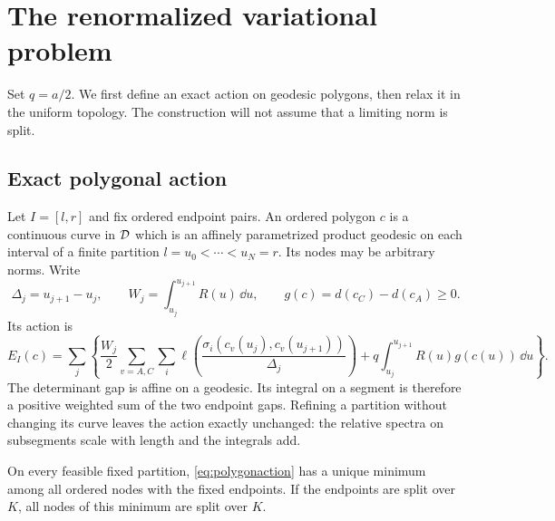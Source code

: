 \section{The renormalized variational problem}\label{sec:variational}

Set $q=a/2$. We first define an exact action on geodesic polygons, then
relax it in the uniform topology. The construction will not assume that
a limiting norm is split.

\subsection{Exact polygonal action}
Let $I=[l,r]$ and fix ordered endpoint pairs. An ordered polygon $c$ is
a continuous curve in $\mathcal D$ which is an affinely parametrized product
geodesic on each interval of a finite partition
$l=u_0<\cdots<u_N=r$. Its nodes may be arbitrary norms. Write
\[
 \Delta_j=u_{j+1}-u_j,\qquad
 W_j=\int_{u_j}^{u_{j+1}}R(u)\,\dd u,\qquad
 g(c)=d(c_C)-d(c_A)\ge0.
\]
Its action is
\begin{equation}\label{eq:polygonaction}
 E_I(c)=\sum_j\left\{
 \frac{W_j}{2}\sum_{v=A,C}\sum_i
   \ell\left(\frac{\sigma_i(c_v(u_j),c_v(u_{j+1}))}{\Delta_j}\right)
 +q\int_{u_j}^{u_{j+1}}R(u)g(c(u))\,\dd u\right\}.
\end{equation}
The determinant gap is affine on a geodesic. Its integral on a segment
is therefore a positive weighted sum of the two endpoint gaps.
Refining a partition without changing its curve leaves the action
exactly unchanged: the relative spectra on subsegments scale with
length and the integrals add.

\begin{proposition}\label{prop:finitepartition}
On every feasible fixed partition, \eqref{eq:polygonaction} has a unique
minimum among all ordered nodes with the fixed endpoints. If the endpoints
are split over $K$, all nodes of this minimum are split over $K$.
\end{proposition}

